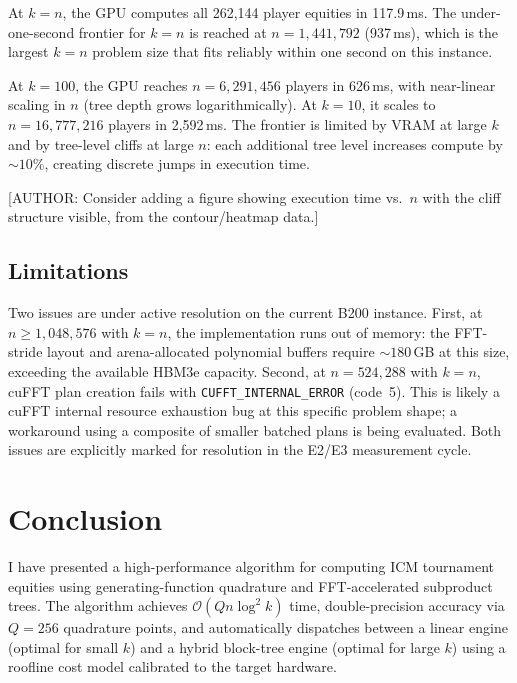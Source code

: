 \documentclass[11pt]{article}
\newcommand{\bigO}{\mathcal{O}}
\begin{document}
At $k = n$, the GPU computes all 262{,}144 player equities in
117.9\,ms. The under-one-second frontier for $k = n$ is reached at
$n = 1{,}441{,}792$ (937\,ms), which is the largest $k = n$ problem
size that fits reliably within one second on this instance.

At $k = 100$, the GPU reaches $n = 6{,}291{,}456$ players in
626\,ms, with near-linear scaling in $n$ (tree depth grows
logarithmically). At $k = 10$, it scales to $n = 16{,}777{,}216$
players in 2{,}592\,ms. The frontier is limited by VRAM at large
$k$ and by tree-level cliffs at large $n$: each additional tree
level increases compute by ${\sim}10\%$, creating discrete jumps
in execution time.

[AUTHOR: Consider adding a figure showing execution time vs.\ $n$ with
the cliff structure visible, from the contour/heatmap data.]

\subsection{Limitations}

Two issues are under active resolution on the current B200 instance.
First, at $n \ge 1{,}048{,}576$ with $k = n$, the implementation runs
out of memory: the FFT-stride layout and arena-allocated polynomial
buffers require ${\sim}180$\,GB at this size, exceeding the available
HBM3e capacity. Second, at $n = 524{,}288$ with $k = n$, cuFFT plan
creation fails with \texttt{CUFFT\_INTERNAL\_ERROR} (code~5). This is
likely a cuFFT internal resource exhaustion bug at this specific
problem shape; a workaround using a composite of smaller batched plans
is being evaluated. Both issues are explicitly marked for resolution
in the E2/E3 measurement cycle.

\section{Conclusion}\label{sec:conclusion}

I have presented a high-performance algorithm for computing ICM tournament
equities using generating-function quadrature and FFT-accelerated
subproduct trees. The algorithm achieves $\bigO(Qn\log^2 k)$ time,
double-precision accuracy via $Q = 256$ quadrature points, and
automatically dispatches between a linear engine (optimal for small $k$)
and a hybrid block-tree engine (optimal for large $k$) using a roofline
cost model calibrated to the target hardware.
\end{document}

